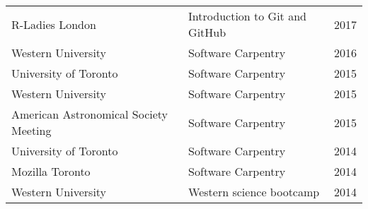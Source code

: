 \begin{tabularx}{\textwidth}{XXr}
R-Ladies London & Introduction to Git and GitHub & 2017\\
Western University& Software Carpentry & 2016\\
University of Toronto & Software Carpentry & 2015\\
Western University & Software Carpentry &2015\\ %
American Astronomical Society Meeting  & Software Carpentry & 2015\\
University of Toronto & Software Carpentry & 2014\\
Mozilla Toronto & Software Carpentry & 2014\\
Western University & Western science bootcamp & 2014\\
\end{tabularx}

